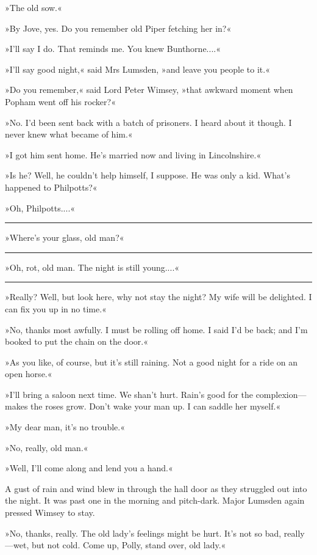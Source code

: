 »The old sow.«

»By Jove, yes. Do you remember old Piper fetching her in?«

»I'll say I do. That reminds me. You knew Bunthorne....«

»I'll say good night,« said Mrs Lumsden, »and leave you people to it.«

»Do you remember,« said Lord Peter Wimsey, »that awkward moment when Popham went off his rocker?«

»No. I'd been sent back with a batch of prisoners. I heard about it though. I never knew what became of him.«

»I got him sent home. He's married now and living in Lincolnshire.«

»Is he? Well, he couldn't help himself, I suppose. He was only a kid. What's happened to Philpotts?«

»Oh, Philpotts....«

\noindent\hfil\rule{0.5\textwidth}{.4pt}\hfil 

»Where's your glass, old man?«

\noindent\hfil\rule{0.5\textwidth}{.4pt}\hfil 

»Oh, rot, old man. The night is still young....«

\noindent\hfil\rule{0.5\textwidth}{.4pt}\hfil 

»Really? Well, but look here, why not stay the night? My wife will be delighted. I can fix you up in no time.«

»No, thanks most awfully. I must be rolling off home. I said I'd be back; and I'm booked to put the chain on the door.«

»As you like, of course, but it's still raining. Not a good night for a ride on an open horse.«

»I'll bring a saloon next time. We shan't hurt. Rain's good for the complexion—makes the roses grow. Don't wake your man up. I can saddle her myself.«

»My dear man, it's no trouble.«

»No, really, old man.«

»Well, I'll come along and lend you a hand.«

A gust of rain and wind blew in through the hall door as they struggled out into the night. It was past one in the morning and pitch-dark. Major Lumsden again pressed Wimsey to stay.

»No, thanks, really. The old lady's feelings might be hurt. It's not so bad, really—wet, but not cold. Come up, Polly, stand over, old lady.«

